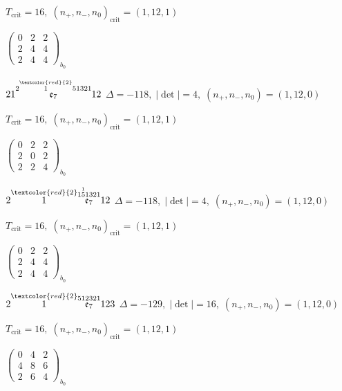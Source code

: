 \documentclass[10pt]{article}
\begin{document}
\hspace{1em}$T_{\text{crit}}=16,\; (n_+,n_-,n_0)_{\text{crit}}=(1,12,1)$

\hspace{2em}$\left(\begin{smallmatrix}0 & 2 & 2 \\ 2 & 4 & 4 \\ 2 & 4 & 4\end{smallmatrix}\right)_{\!b_0}$

$21\overset{2\overset{\textcolor{red}{2}}{1}51321}{\mathfrak{e}_7}12$ \quad $\Delta=-118,\; |\det|=4,\; (n_+,n_-,n_0)=(1,12,0)$

\hspace{1em}$T_{\text{crit}}=16,\; (n_+,n_-,n_0)_{\text{crit}}=(1,12,1)$

\hspace{2em}$\left(\begin{smallmatrix}0 & 2 & 2 \\ 2 & 0 & 2 \\ 2 & 2 & 4\end{smallmatrix}\right)_{\!b_0}$

\smallskip

$2\overset{\textcolor{red}{2}}{1}\overset{1\overset{1}{5}1321}{\mathfrak{e}_7}12$ \quad $\Delta=-118,\; |\det|=4,\; (n_+,n_-,n_0)=(1,12,0)$

\hspace{1em}$T_{\text{crit}}=16,\; (n_+,n_-,n_0)_{\text{crit}}=(1,12,1)$

\hspace{2em}$\left(\begin{smallmatrix}0 & 2 & 2 \\ 2 & 4 & 4 \\ 2 & 4 & 4\end{smallmatrix}\right)_{\!b_0}$

\smallskip

$2\overset{\textcolor{red}{2}}{1}\overset{512321}{\mathfrak{e}_7}123$ \quad $\Delta=-129,\; |\det|=16,\; (n_+,n_-,n_0)=(1,12,0)$

\hspace{1em}$T_{\text{crit}}=16,\; (n_+,n_-,n_0)_{\text{crit}}=(1,12,1)$

\hspace{2em}$\left(\begin{smallmatrix}0 & 4 & 2 \\ 4 & 8 & 6 \\ 2 & 6 & 4\end{smallmatrix}\right)_{\!b_0}$
\end{document}
